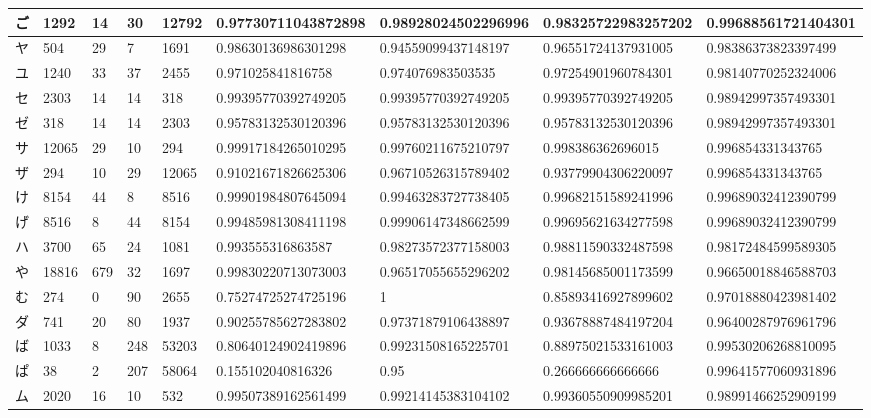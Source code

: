 \begin{table}[H]
\begin{center}
\begin{CJK}{UTF8}{min}
\begin{tabular}{ | l | l | l | l | l | l | l | l | l | }
			ご & 1292 & 14 & 30 & 12792 & 0.97730711043872898 & 0.98928024502296996 & 0.98325722983257202 & 0.99688561721404301 \\ \hline
			ヤ & 504 & 29 & 7 & 1691 & 0.98630136986301298 & 0.94559099437148197 & 0.96551724137931005 & 0.98386373823397499 \\ \hline
			ユ & 1240 & 33 & 37 & 2455 & 0.971025841816758 & 0.974076983503535 & 0.97254901960784301 & 0.98140770252324006 \\ \hline
			セ & 2303 & 14 & 14 & 318 & 0.99395770392749205 & 0.99395770392749205 & 0.99395770392749205 & 0.98942997357493301 \\ \hline
			ゼ & 318 & 14 & 14 & 2303 & 0.95783132530120396 & 0.95783132530120396 & 0.95783132530120396 & 0.98942997357493301 \\ \hline
			サ & 12065 & 29 & 10 & 294 & 0.99917184265010295 & 0.99760211675210797 & 0.998386362696015 & 0.996854331343765 \\ \hline
			ザ & 294 & 10 & 29 & 12065 & 0.91021671826625306 & 0.96710526315789402 & 0.93779904306220097 & 0.996854331343765 \\ \hline
			け & 8154 & 44 & 8 & 8516 & 0.99901984807645094 & 0.99463283727738405 & 0.99682151589241996 & 0.99689032412390799 \\ \hline
			げ & 8516 & 8 & 44 & 8154 & 0.99485981308411198 & 0.99906147348662599 & 0.99695621634277598 & 0.99689032412390799 \\ \hline
			ハ & 3700 & 65 & 24 & 1081 & 0.993555316863587 & 0.98273572377158003 & 0.98811590332487598 & 0.98172484599589305 \\ \hline
			や & 18816 & 679 & 32 & 1697 & 0.99830220713073003 & 0.96517055655296202 & 0.98145685001173599 & 0.96650018846588703 \\ \hline
			む & 274 & 0 & 90 & 2655 & 0.75274725274725196 & 1 & 0.85893416927899602 & 0.97018880423981402 \\ \hline
			ダ & 741 & 20 & 80 & 1937 & 0.90255785627283802 & 0.97371879106438897 & 0.93678887484197204 & 0.96400287976961796 \\ \hline
			ば & 1033 & 8 & 248 & 53203 & 0.80640124902419896 & 0.99231508165225701 & 0.88975021533161003 & 0.99530206268810095 \\ \hline
			ぱ & 38 & 2 & 207 & 58064 & 0.155102040816326 & 0.95 & 0.266666666666666 & 0.99641577060931896 \\ \hline
			ム & 2020 & 16 & 10 & 532 & 0.99507389162561499 & 0.99214145383104102 & 0.99360550909985201 & 0.98991466252909199 \\ \hline

\end{tabular}
\end{CJK}
\end{center}
\end{table}
